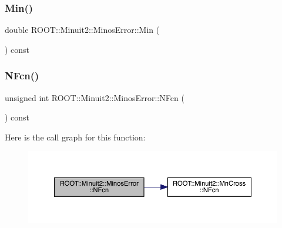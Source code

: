 \subsubsection{\texorpdfstring{Min()}{Min()}\hspace{0.1cm}{\footnotesize\ttfamily [2/2]}}
{\footnotesize\ttfamily double R\+O\+O\+T\+::\+Minuit2\+::\+Minos\+Error\+::\+Min (\begin{DoxyParamCaption}{ }\end{DoxyParamCaption}) const\hspace{0.3cm}{\ttfamily [inline]}}

\mbox{\label{classROOT_1_1Minuit2_1_1MinosError_a4956b01f7899f42847617c378e5c86c2}} 
\subsubsection{\texorpdfstring{NFcn()}{NFcn()}\hspace{0.1cm}{\footnotesize\ttfamily [1/2]}}
{\footnotesize\ttfamily unsigned int R\+O\+O\+T\+::\+Minuit2\+::\+Minos\+Error\+::\+N\+Fcn (\begin{DoxyParamCaption}{ }\end{DoxyParamCaption}) const\hspace{0.3cm}{\ttfamily [inline]}}

Here is the call graph for this function\+:
\nopagebreak
\begin{figure}[H]
\begin{center}
\leavevmode
\includegraphics[width=350pt]{d2/dd1/classROOT_1_1Minuit2_1_1MinosError_a4956b01f7899f42847617c378e5c86c2_cgraph}
\end{center}
\end{figure}
\mbox{\label{classROOT_1_1Minuit2_1_1MinosError_a4956b01f7899f42847617c378e5c86c2}} 
